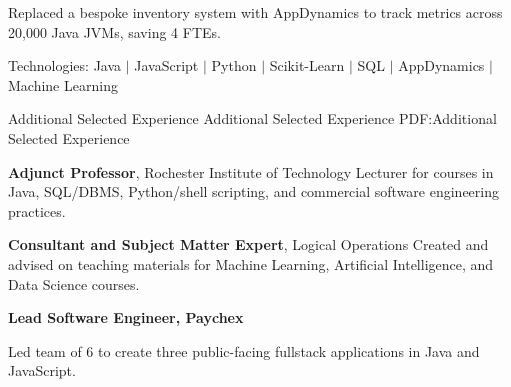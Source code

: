 \documentclass[MMMMyyyy,nonstopmode]{simpleresumecv_stacked}
\newcommand{\tech}[1]{\Gap\textrm{Technologies:} #1}
\newcommand{\comment}[1]{\ignorespaces} %
\newif\ifLOCATION
\newif\ifNOTSELECTED
\begin{document}
\begin{Body}
\begin{Detail}
\BulletItem
Replaced a bespoke inventory system with AppDynamics to track metrics across 20,000 Java JVMs, saving 4 FTEs.


\tech{Java $|$ JavaScript $|$ Python $|$ Scikit-Learn $|$ \comment{TensorFlow $|$} SQL $|$ AppDynamics $|$ Machine Learning}
\fi

\end{Detail}

\BigGap

\Section
{Additional Selected Experience}
{Additional Selected Experience}
{PDF:Additional Selected Experience}

\Entry
\textbf{Adjunct Professor}, Rochester Institute of Technology
\BulletItem 
Lecturer for courses in Java, SQL/DBMS, Python/shell scripting, and commercial software engineering practices.

\Entry
\textbf{Consultant and Subject Matter Expert}, Logical Operations %
\hfill
\BulletItem
Created and advised on teaching materials for Machine Learning, Artificial Intelligence, and Data Science courses.


\ifLOCATION
\hfill
Rochester, New York
\fi



\ifNOTSELECTED
\Entry
\textbf{Lead Software Engineer, Paychex}
\hfill

\begin{Detail}
Led team of 6 to create three public-facing fullstack applications in Java and JavaScript.
\end{Detail}


\end{Body}
\end{document}
